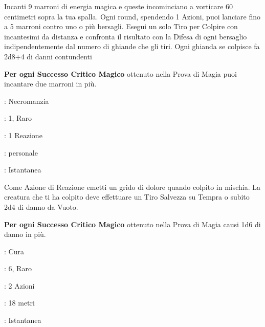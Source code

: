 \begin{multicols}{2}
Incanti 9 marroni di energia magica e queste incominciano a vorticare 60 centimetri sopra la tua spalla.
Ogni round, spendendo 1 Azioni, puoi lanciare fino a 5 marroni contro uno o più bersagli.
Esegui un solo Tiro per Colpire con incantesimi da distanza e confronta il risultato con la Difesa di ogni bersaglio indipendentemente dal numero di ghiande che gli tiri. Ogni ghianda se colpisce fa 2d8+4 di danni contundenti

\textbf{Per ogni Successo Critico Magico} ottenuto nella Prova di Magia puoi incantare due marroni in più.

\noindent\colorbox{OBSSgold!10}{
\begin{minipage}{0.95\linewidth}
\begin{description}[noitemsep, topsep=0pt, parsep=0pt, partopsep=0pt, leftmargin=0cm, labelwidth=1.3cm]
	\item[\textbf{Lista}]: Necromanzia
	\item[\textbf{Livello}]: 1, Raro
	\item[\textbf{Lancio}]: 1 Reazione
	\item[\textbf{Gittata}]: personale
	\item[\textbf{Durata}]: Istantanea
\end{description}
\end{minipage}}\smallskip

Come Azione di Reazione emetti un grido di dolore quando colpito in mischia. La creatura che ti ha colpito deve effettuare un Tiro Salvezza su Tempra o subito 2d4 di danno da Vuoto.

\textbf{Per ogni Successo Critico Magico} ottenuto nella Prova di Magia causi 1d6 di danno in più.

\noindent\colorbox{OBSSgold!10}{
\begin{minipage}{0.95\linewidth}
\begin{description}[noitemsep, topsep=0pt, parsep=0pt, partopsep=0pt, leftmargin=0cm, labelwidth=1.3cm]
	\item[\textbf{Lista}]: Cura
	\item[\textbf{Livello}]: 6, Raro
	\item[\textbf{Lancio}]: 2 Azioni
	\item[\textbf{Gittata}]: 18 metri
	\item[\textbf{Durata}]: Istantanea
\end{description}
\end{minipage}}\smallskip


\end{multicols}
